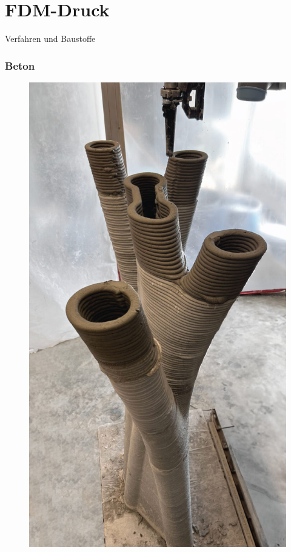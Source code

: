 \documentclass{beamer}
\begin{document}
\section{FDM-Druck}
\begin{frame}{Verfahren und Baustoffe}

\subsubsection{Beton}
    \begin{figure}[H]
        \centering
        \begin{minipage}{0.3\textwidth}
           \centering
           \includegraphics[width=\linewidth]{figures/beispiele/meibodi-2023-1.jpg}

\end{minipage}
\end{figure}
\end{frame}
\end{document}
